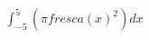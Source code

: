 \documentclass[preview]{standalone}
\begin{document}
\begin{align*}
\int_{-5}^{5}\left(\pi fresca\left(x\right)^{2}\right)dx
\end{align*}
\end{document}
